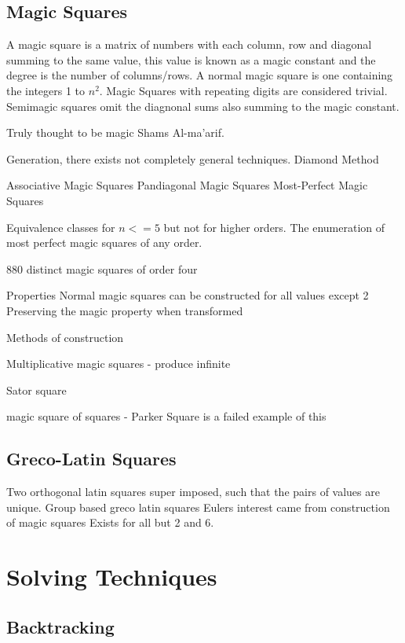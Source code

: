 \documentclass[a4paper,12pt]{article}
\begin{document}
	\subsection{Magic Squares}

		A magic square is a matrix of numbers with each column, row and diagonal summing to the same value, 
		this value is known as a magic constant and the degree is the number of columns/rows.
		A normal magic square is one containing the integers 1 to $n^2$.
		Magic Squares with repeating digits are considered trivial.
		Semimagic squares omit the diagnonal sums also summing to the magic constant.

		Truly thought to be magic Shams Al-ma'arif.

		Generation, there exists not completely general techniques. Diamond Method

		Associative Magic Squares
		Pandiagonal Magic Squares
		Most-Perfect Magic Squares
		
		Equivalence classes for $n<=5$ but not for higher orders.
		The enumeration of most perfect magic squares of any order.

		880 distinct magic squares of order four

		Properties
			Normal magic squares can be constructed for all values except 2
			Preserving the magic property when transformed

		Methods of construction

		Multiplicative magic squares - produce infinite

		Sator square

		magic square of squares - Parker Square is a failed example of this
	
	\subsection{Greco-Latin Squares}

		Two orthogonal latin squares super imposed, such that the pairs of values are unique.
		Group based greco latin squares
		Eulers interest came from construction of magic squares
		Exists for all but 2 and 6.
		
\section{Solving Techniques}
	\subsection{Backtracking}
		
\end{document}
